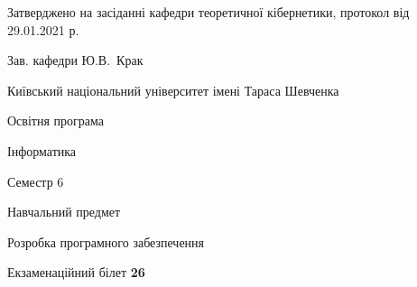 \documentclass[10pt, ukrainian]{article}
\begin{document}
{\vspace{5mm}\smallskip \begin {small} Затверджено на засіданні кафедри теоретичної кібернетики, протокол  від   29.01.2021 р.\par\smallskip\smallskip
{\parbox {6.5 cm}{Зав. кафедри \dotfill Ю.В.~Крак}} \end{small}}
\newpage

{{\begin {small}\par
{ \center  Київський національний університет імені Тараса Шевченка \par}
{\parbox {5 cm}{Освітня програма \hfill}{\parbox {7 cm}{Інформатика \hfill}}\parbox {6 cm}{\hfill Семестр 6}}\par
{\parbox {5 cm} {Навчальний предмет \hfill}\parbox {7 cm}{Розробка програмного забезпечення \hfill}\parbox {6cm}{\hfill}\par}\vspace{-7pt} \end{small}}{\center Екзаменаційний білет \No \textbf
{ 26 }\par}}
\end{document}
